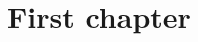 \documentclass[../phdthesis]{subfiles}
\begin{document}
\chapter{First chapter}
\label{chapter1}

\ifSubfilesClassLoaded{
	\printbibliography
}{}
\end{document}
